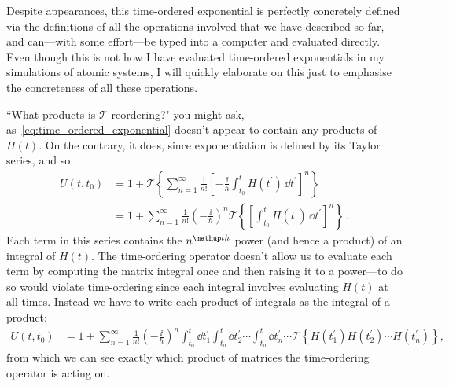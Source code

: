 Despite appearances, this time-ordered exponential is perfectly concretely defined via the definitions of all the operations involved that we have described so far, and can---with some effort---be typed into a computer and evaluated directly. Even though this is not how I have evaluated time-ordered exponentials in my simulations of atomic systems, I will quickly elaborate on this just to emphasise the concreteness of all these operations.

``What products is $\mathcal{T}$ reordering?" you might ask, as~\eqref{eq:time_ordered_exponential} doesn't appear to contain any products of $H(t)$. On the contrary, it does, since exponentiation is defined by its Taylor series, and so
\begin{align}
U(t, t_0) &= 1 + \mathcal{T}\left\{\sum_{n=1}^\infty \frac1 {n!}\left[ -\frac \ii \hbar \int_{t_0}^t H(t^\prime)\,\dd t^\prime\right]^n\right\}\\
&= 1 + \sum_{n=1}^\infty \frac1 {n!}  \left(-\frac \ii \hbar \right)^n \mathcal{T}\left\{\left[\int_{t_0}^t H(t^\prime)\,\dd t^\prime\right]^n\right\}\,.
\end{align}
Each term in this series contains the $n^\up{th}$ power (and hence a product) of an integral of $H(t)$. The time-ordering operator doesn't allow us to evaluate each term by computing the matrix integral once and then raising it to a power---to do so would violate time-ordering since each integral involves evaluating $H(t)$ at all times. Instead we have to write each product of integrals as the integral of a product:
\begin{align}
U(t, t_0)
&= 1 + \sum_{n=1}^\infty \frac1 {n!}  \left(-\frac \ii \hbar \right)^n
\int_{t_0}^t \dd t_1^\prime
\int_{t_0}^t \dd t_2^\prime
\cdots
\int_{t_0}^t \dd t^\prime_n
\cdots
\mathcal{T}\left\{H(t_1^\prime)H(t_2^\prime)\cdots H(t_n^\prime)\right\},
\end{align}
from which we can see exactly which product of matrices the time-ordering operator is acting on.

